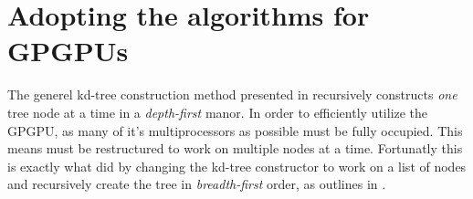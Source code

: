 










\section{Adopting the algorithms for GPGPUs}


The generel kd-tree construction method presented in
 recursively constructs \textit{one} tree
node at a time in a \textit{depth-first} manor. In order to
efficiently utilize the GPGPU, as many of it's multiprocessors as
possible must be fully occupied. This means 
must be restructured to work on multiple nodes at a time. Fortunatly
this is exactly what \zhou{} did by changing the kd-tree constructor to
work on a list of nodes and recursively create the tree in
\textit{breadth-first} order, as outlines in
. 

